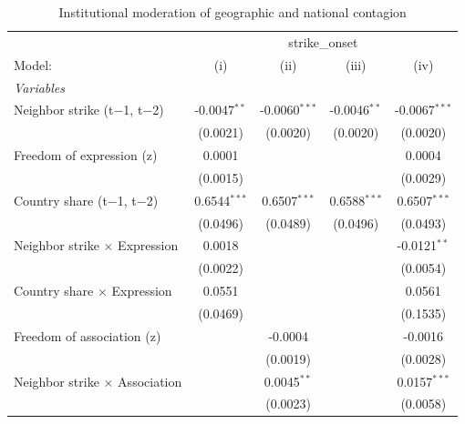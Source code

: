 \documentclass[
  11pt,
]{article}
\begin{document}
\begingroup
\centering
\begin{table}
\caption{Institutional moderation of geographic and national contagion}\tabularnewline

\centering
\begin{tabular}{lcccc}
   \hline
    & \multicolumn{4}{c}{strike\_onset}\\
   Model:                                & (i)            & (ii)            & (iii)          & (iv)\\  
   \midrule
   \emph{Variables}\\
   Neighbor strike (t$-$1, t$-$2)        & -0.0047$^{**}$ & -0.0060$^{***}$ & -0.0046$^{**}$ & -0.0067$^{***}$\\   
                                         & (0.0021)       & (0.0020)        & (0.0020)       & (0.0020)\\   
   Freedom of expression (z)             & 0.0001         &                 &                & 0.0004\\   
                                         & (0.0015)       &                 &                & (0.0029)\\   
   Country share (t$-$1, t$-$2)          & 0.6544$^{***}$ & 0.6507$^{***}$  & 0.6588$^{***}$ & 0.6507$^{***}$\\   
                                         & (0.0496)       & (0.0489)        & (0.0496)       & (0.0493)\\   
   Neighbor strike $\times$ Expression   & 0.0018         &                 &                & -0.0121$^{**}$\\   
                                         & (0.0022)       &                 &                & (0.0054)\\   
   Country share $\times$ Expression     & 0.0551         &                 &                & 0.0561\\   
                                         & (0.0469)       &                 &                & (0.1535)\\   
   Freedom of association (z)            &                & -0.0004         &                & -0.0016\\   
                                         &                & (0.0019)        &                & (0.0028)\\   
   Neighbor strike $\times$ Association  &                & 0.0045$^{**}$   &                & 0.0157$^{***}$\\   
                                         &                & (0.0023)        &                & (0.0058)\\   

\end{tabular}
\end{table}
\end{document}
